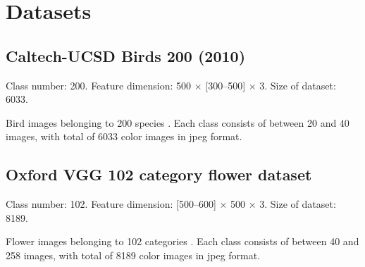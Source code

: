 \documentclass{article}
\begin{document}
\vspace{-3mm}
\section{Datasets}
\vspace{-3mm}
\subsection{Caltech-UCSD Birds 200 (2010)}
\vspace{-3mm}
	Class number: 200. Feature dimension: 500 $\times$ [300--500] $\times$ 3. Size of dataset: 6033.
	
	Bird images belonging to 200 species \cite{Welinder2010}. Each class consists of between 20 and 40 images, with total of 6033 color images in jpeg format.


\vspace{-3mm}
\subsection{Oxford VGG 102 category flower dataset}
\vspace{-3mm}
	Class number: 102. Feature dimension: [500--600] $\times$ 500 $\times$ 3. Size of dataset: 8189.

	Flower images belonging to 102 categories \cite{Nilsback2008}. Each class consists of between 40 and 258 images, with total of 8189 color images in jpeg format.











\end{document}
